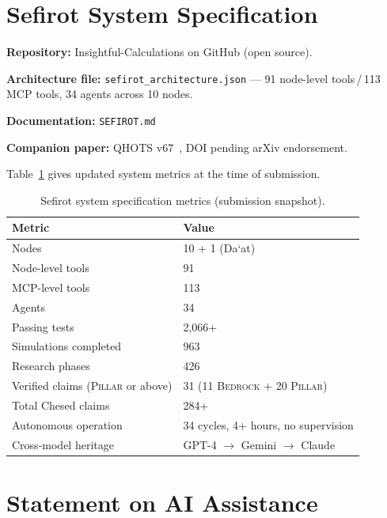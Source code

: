 \documentclass[11pt]{article}
\theoremstyle{definition}
\theoremstyle{remark}
\newcommand{\BEDROCK}{\textsc{Bedrock}}
\newcommand{\PILLAR}{\textsc{Pillar}}
\begin{document}
\section{Sefirot System Specification}
\label{app:sefirot-spec}

\noindent\textbf{Repository:} Insightful-Calculations on GitHub (open source).

\medskip
\noindent\textbf{Architecture file:} \texttt{sefirot\_architecture.json} ---
91 node-level tools\,/\,113 MCP tools, 34 agents across 10 nodes.

\medskip
\noindent\textbf{Documentation:} \texttt{SEFIROT.md}

\medskip
\noindent\textbf{Companion paper:} QHOTS v67~\cite{qhots2026}, DOI pending
arXiv endorsement.

\medskip
\noindent Table~\ref{tab:app-metrics} gives updated system metrics at the time
of submission.

\begin{table}[ht]
\centering
\caption{Sefirot system specification metrics (submission snapshot).}
\label{tab:app-metrics}
\begin{tabular}{@{}ll@{}}
\toprule
\textbf{Metric} & \textbf{Value} \\
\midrule
Nodes                     & 10 + 1 (Da\textquoteleft at) \\
Node-level tools          & 91 \\
MCP-level tools           & 113 \\
Agents                    & 34 \\
Passing tests             & 2,066+ \\
Simulations completed     & 963 \\
Research phases           & 426 \\
Verified claims (\PILLAR{} or above) & 31 (11 \BEDROCK{} + 20 \PILLAR) \\
Total Chesed claims       & 284+ \\
Autonomous operation      & 34 cycles, 4+ hours, no supervision \\
Cross-model heritage      & GPT-4 $\to$ Gemini $\to$ Claude \\
\bottomrule
\end{tabular}
\end{table}

\section*{Statement on AI Assistance}
\label{sec:ai-statement}
\end{document}

